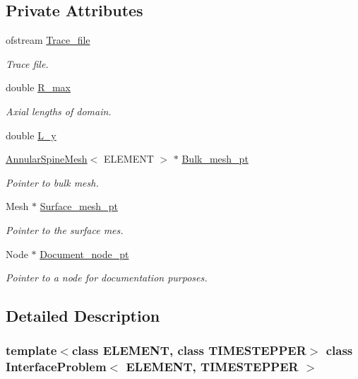 \subsection*{Private Attributes}
\begin{DoxyCompactItemize}
\item 
ofstream \hyperlink{classInterfaceProblem_a45e3bf3b44bcbeefab21a3598bef6179}{Trace\+\_\+file}
\begin{DoxyCompactList}\small\item\em Trace file. \end{DoxyCompactList}\item 
double \hyperlink{classInterfaceProblem_a9367afe223abf813838405a7d377767c}{R\+\_\+max}
\begin{DoxyCompactList}\small\item\em Axial lengths of domain. \end{DoxyCompactList}\item 
double \hyperlink{classInterfaceProblem_af05142e27af8078fdb544bef158ab83d}{L\+\_\+y}
\item 
\hyperlink{classoomph_1_1AnnularSpineMesh}{Annular\+Spine\+Mesh}$<$ E\+L\+E\+M\+E\+NT $>$ $\ast$ \hyperlink{classInterfaceProblem_a444b33e2ccb3eacdc619abda73575a50}{Bulk\+\_\+mesh\+\_\+pt}
\begin{DoxyCompactList}\small\item\em Pointer to bulk mesh. \end{DoxyCompactList}\item 
Mesh $\ast$ \hyperlink{classInterfaceProblem_a1b373c6e9f49bef78404511c53e622bb}{Surface\+\_\+mesh\+\_\+pt}
\begin{DoxyCompactList}\small\item\em Pointer to the surface mes. \end{DoxyCompactList}\item 
Node $\ast$ \hyperlink{classInterfaceProblem_a852833a405566b7f08b852e7174cfdeb}{Document\+\_\+node\+\_\+pt}
\begin{DoxyCompactList}\small\item\em Pointer to a node for documentation purposes. \end{DoxyCompactList}\end{DoxyCompactItemize}


\subsection{Detailed Description}
\subsubsection*{template$<$class E\+L\+E\+M\+E\+NT, class T\+I\+M\+E\+S\+T\+E\+P\+P\+ER$>$\newline
class Interface\+Problem$<$ E\+L\+E\+M\+E\+N\+T, T\+I\+M\+E\+S\+T\+E\+P\+P\+E\+R $>$}

